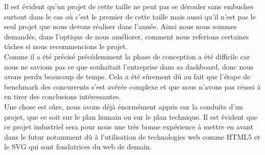 \documentclass[12pt]{report}
\begin{document}
Il est évident qu’un projet de cette taille ne peut pas se dérouler sans embuches surtout dans le cas où c’est le premier de cette taille mais aussi qu’il n’est pas le seul projet que nous devons réaliser dans l’année. Ainsi nous nous sommes demandés, dans l’optique de nous améliorer, comment nous referions certaines tâches si nous recommencions le projet. \\

Comme il a été précisé précédemment la phase de conception a été difficile car nous ne savions pas ce que souhaitait l’entreprise dans sa dashboard, donc nous avons perdu beaucoup de temps. Cela a été sûrement dû au fait que l’étape de benchmark des concurrents s’est avérée complexe et que nous n’avons pas réussi à en tirer des conclusions intéressantes.\\

Une chose est sûre, nous avons déjà énormément appris sur la conduite d’un projet, que ce soit sur le plan humain ou sur le plan technique. Il est évident que ce projet industriel sera pour nous une très bonne expérience à mettre en avant dans le futur notamment dû à l’utilisation de technologies web comme HTML5 et le SVG qui sont fondatrices du web de demain.\\
\end{document}

